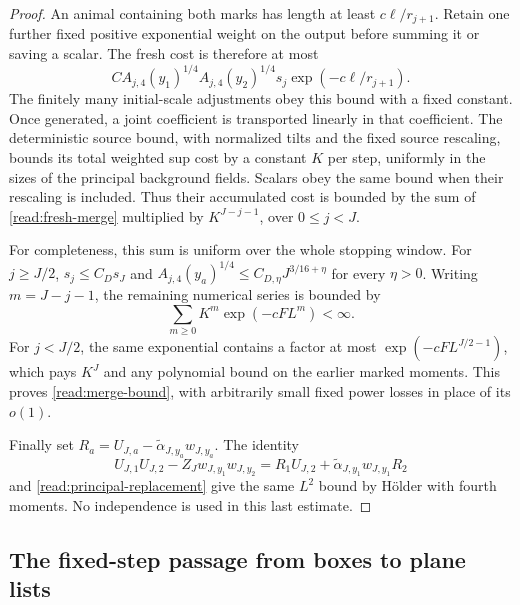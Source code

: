 \begin{proof}
An animal containing both marks has length at least
$c\ell/r_{j+1}$.  Retain one further fixed positive exponential weight
on the output before summing it or saving a scalar.  The fresh cost is
therefore at most
\begin{equation}
 C A_{j,4}(y_1)^{1/4}A_{j,4}(y_2)^{1/4}s_j
       \exp(-c\ell/r_{j+1}).
 \label{read:fresh-merge}
\end{equation}
The finitely many initial-scale adjustments obey this bound with a
fixed constant.  Once generated, a joint coefficient is transported
linearly in that coefficient.  The deterministic source bound, with
normalized tilts and the fixed source rescaling, bounds its total
weighted sup cost by a constant $K$ per step, uniformly in the sizes
of the principal background fields.  Scalars obey the same bound
when their rescaling is included.  Thus their accumulated cost is
bounded by the sum of \eqref{read:fresh-merge} multiplied by
$K^{J-j-1}$, over $0\le j<J$.

For completeness, this sum is uniform over the whole stopping window.
For $j\ge J/2$, $s_j\le C_Ds_J$ and
$A_{j,4}(y_a)^{1/4}\le C_{D,\eta}J^{3/16+\eta}$ for every $\eta>0$.
Writing $m=J-j-1$, the remaining numerical series is bounded by
\[
 \sum_{m\ge0}K^m\exp(-cF L^m)<\infty.
\]
For $j<J/2$, the same exponential contains a factor at most
$\exp(-cF L^{J/2-1})$, which pays $K^J$ and any polynomial bound
on the earlier marked moments.  This proves
\eqref{read:merge-bound}, with arbitrarily small fixed power losses
in place of its $o(1)$.

Finally set $R_a=U_{J,a}-\widetilde\alpha_{J,y_a}w_{J,y_a}$.
The identity
\[
 U_{J,1}U_{J,2}-Z_Jw_{J,y_1}w_{J,y_2}
 =R_1U_{J,2}+
   \widetilde\alpha_{J,y_1}w_{J,y_1}R_2
\]
and \eqref{read:principal-replacement} give the same $L^2$ bound by
H\"older with fourth moments.  No independence is used in this last
estimate.
\end{proof}

\subsection{The fixed-step passage from boxes to plane lists}

